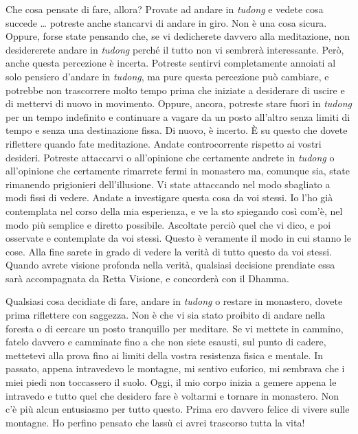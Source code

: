 Che cosa pensate di fare, allora? Provate ad andare in \emph{tudong} e
vedete cosa succede \ldots{} potreste anche stancarvi di andare in giro. Non
è una cosa sicura. Oppure, forse state pensando che, se vi dedicherete
davvero alla meditazione, non desidererete andare in \emph{tudong}
perché il tutto non vi sembrerà interessante. Però, anche questa
percezione è incerta. Potreste sentirvi completamente annoiati al solo
pensiero d'andare in \emph{tudong}, ma pure questa percezione può
cambiare, e potrebbe non trascorrere molto tempo prima che iniziate a
desiderare di uscire e di mettervi di nuovo in movimento. Oppure,
ancora, potreste stare fuori in \emph{tudong} per un tempo indefinito e
continuare a vagare da un posto all'altro senza limiti di tempo e senza
una destinazione fissa. Di nuovo, è incerto. È su questo che dovete
riflettere quando fate meditazione. Andate controcorrente rispetto ai
vostri desideri. Potreste attaccarvi o all'opinione che certamente
andrete in \emph{tudong} o all'opinione che certamente rimarrete fermi
in monastero ma, comunque sia, state rimanendo prigionieri
dell'illusione. Vi state attaccando nel modo sbagliato a modi fissi di
vedere. Andate a investigare questa cosa da voi stessi. Io l'ho già
contemplata nel corso della mia esperienza, e ve la sto spiegando così
com'è, nel modo più semplice e diretto possibile. Ascoltate perciò quel
che vi dico, e poi osservate e contemplate da voi stessi. Questo è
veramente il modo in cui stanno le cose. Alla fine sarete in grado di
vedere la verità di tutto questo da voi stessi. Quando avrete visione
profonda nella verità, qualsiasi decisione prendiate essa sarà
accompagnata da Retta Visione, e concorderà con il Dhamma.

Qualsiasi cosa decidiate di fare, andare in \emph{tudong} o restare in
monastero, dovete prima riflettere con saggezza. Non è che vi sia stato
proibito di andare nella foresta o di cercare un posto tranquillo per
meditare. Se vi mettete in cammino, fatelo davvero e camminate fino a
che non siete esausti, sul punto di cadere, mettetevi alla prova fino ai
limiti della vostra resistenza fisica e mentale. In passato, appena
intravedevo le montagne, mi sentivo euforico, mi sembrava che i miei
piedi non toccassero il suolo. Oggi, il mio corpo inizia a gemere appena
le intravedo e tutto quel che desidero fare è voltarmi e tornare in
monastero. Non c'è più alcun entusiasmo per tutto questo. Prima ero
davvero felice di vivere sulle montagne. Ho perfino pensato che lassù ci
avrei trascorso tutta la vita!

